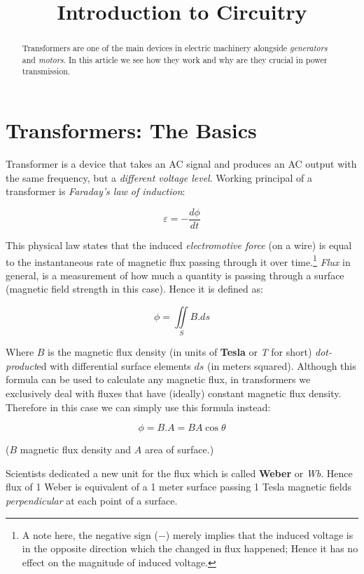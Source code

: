 \documentclass{article}
\begin{document}
	
	\title{Introduction to Circuitry}
	\author{}
	
	\maketitle
	
	\begin{abstract}
	Transformers are one of the main devices in electric machinery alongside \textit{generators} and \textit{motors}.
	In this article we see how they work and why are they crucial in power transmission.
	\end{abstract}
	
	\section{Transformers: The Basics}
	Transformer is a device that takes an AC signal and produces an AC output with the same frequency, but a \textit{different voltage level}.
	Working principal of a transformer is \textit{Faraday's law of induction}:

	$$ \varepsilon = - \frac{d \phi}{dt} $$

	This physical law states that the induced \textit{electromotive force} (on a wire) is equal to the instantaneous rate of magnetic flux passing through it over time.\footnote[1]{A note here, the negative sign ($-$) merely implies that the induced voltage is in the opposite direction which the changed in flux happened; Hence it has no effect on the magnitude of induced voltage.}
	\textit{Flux} in general, is a measurement of how much a quantity is passing through a surface (magnetic field strength in this case).
	Hence it is defined as:
	
	$$ \phi = \iint\limits_S B.ds$$
	
	Where $B$ is the magnetic flux density (in units of \textbf{Tesla} or \textit{T} for short) \textit{dot-product}ed with differential surface elements $ds$ (in meters squared).
	Although this formula can be used to calculate any magnetic flux, in transformers we exclusively deal with fluxes that have (ideally) constant magnetic flux density.
	Therefore in this case we can simply use this formula instead:
	
	$$ \phi = B.A = BA\cos \theta$$
	
	($B$ magnetic flux density and $A$ area of surface.)
	
	Scientists dedicated a new unit for the flux which is called \textbf{Weber} or \textit{Wb}.
	Hence flux of 1 Weber is equivalent of a 1 meter surface passing 1 Tesla magnetic fields \textit{perpendicular} at each point of a surface.
	
\end{document}
